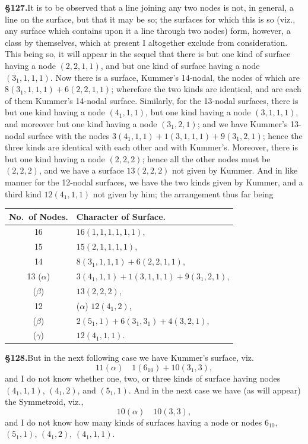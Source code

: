 \documentclass[11pt,a4paper]{article}
\begin{document}
\textbf{\S 127.}\quad It is to be observed that a line joining any two nodes is not, in general, a line on the surface, but that it may be so; the surfaces for which this is so (viz., any surface which contains upon it a line through two nodes) form, however, a class by themselves, which at present I altogether exclude from consideration. This being so, it will appear in the sequel that there is but one kind of surface having a node $(2, 2, 1, 1)$, and but one kind of surface having a node $(3_1, 1, 1, 1)$. Now there is a surface, Kummer's 14-nodal, the nodes of which are $8(3_1, 1, 1, 1) + 6(2, 2, 1, 1)$; wherefore the two kinds are identical, and are each of them Kummer's 14-nodal surface. Similarly, for the 13-nodal surfaces, there is but one kind having a node $(4_1, 1, 1)$, but one kind having a node $(3, 1, 1, 1)$, and moreover but one kind having a node $(3_1, 2, 1)$; and we have Kummer's 13-nodal surface with the nodes $3(4_1, 1, 1) + 1(3, 1, 1, 1) + 9(3_1, 2, 1)$; hence the three kinds are identical with each other and with Kummer's. Moreover, there is but one kind having a node $(2, 2, 2)$; hence all the other nodes must be $(2, 2, 2)$, and we have a surface $13(2, 2, 2)$ not given by Kummer. And in like manner for the 12-nodal surfaces, we have the two kinds given by Kummer, and a third kind $12(4_1, 1, 1)$ not given by him; the arrangement thus far being

\begin{center}
\begin{tabular}{c|l}
No.\ of Nodes. & Character of Surface. \\
\hline
16 & $16(1, 1, 1, 1, 1, 1)$, \\
15 & $15(2, 1, 1, 1, 1)$, \\
14 & $8(3_1, 1, 1, 1) + 6(2, 2, 1, 1)$, \\
13 ($\alpha$) & $3(4_1, 1, 1) + 1(3, 1, 1, 1) + 9(3_1, 2, 1)$, \\
\quad ($\beta$) & $13(2, 2, 2)$, \\
12 & ($\alpha$) $12(4_1, 2)$, \\
\quad ($\beta$) & $2(5_1, 1) + 6(3_1, 3_1) + 4(3, 2, 1)$, \\
\quad ($\gamma$) & $12(4_1, 1, 1)$.
\end{tabular}
\end{center}

\textbf{\S 128.}\quad But in the next following case we have Kummer's surface, viz.
\[
11(\alpha)\quad 1(6_{10}) + 10(3_1, 3),
\]
and I do not know whether one, two, or three kinds of surface having nodes $(4_1, 1, 1)$, $(4_1, 2)$, and $(5_1, 1)$. And in the next case we have (as will appear) the Symmetroid, viz.,
\[
10(\alpha)\quad 10(3, 3),
\]
and I do not know how many kinds of surfaces having a node or nodes $6_{10}$, $(5_1, 1)$, $(4_1, 2)$, $(4_1, 1, 1)$.
\end{document}
